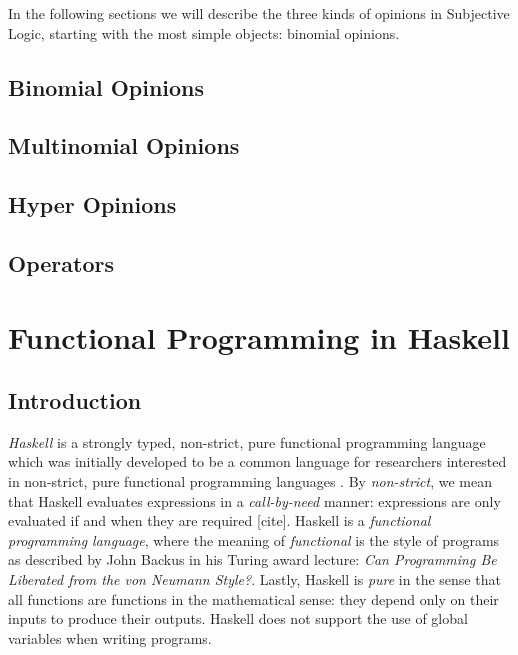 \documentclass[thesis.tex]{subfiles}
\begin{document}
In the following sections we will describe the three kinds of opinions in Subjective Logic, starting
with the most simple objects: binomial opinions.



\subsection{Binomial Opinions}

\subsection{Multinomial Opinions}

\subsection{Hyper Opinions}

\subsection{Operators}






\section{Functional Programming in Haskell}

\subsection{Introduction}

\emph{Haskell} is a strongly typed, non-strict, pure functional
programming language \cite{hudak1992report} which was initially
developed to be a common language for researchers interested in
non-strict, pure functional programming languages
\cite{hudak2007history}.
By \emph{non-strict}, we mean that Haskell
evaluates expressions in a \emph{call-by-need} manner: expressions are
only evaluated if and when they are required [cite]. Haskell is a
\emph{functional programming language}, where the meaning of
\emph{functional} is the style of programs as described by John Backus
in his Turing award lecture: \emph{Can Programming Be Liberated from
  the von Neumann Style?}\cite{backus1978can}.  Lastly, Haskell is
\emph{pure} in the sense that all functions are functions in the
mathematical sense: they depend only on their inputs to produce their
outputs. Haskell does not support the use of global variables when
writing programs.
\end{document}
